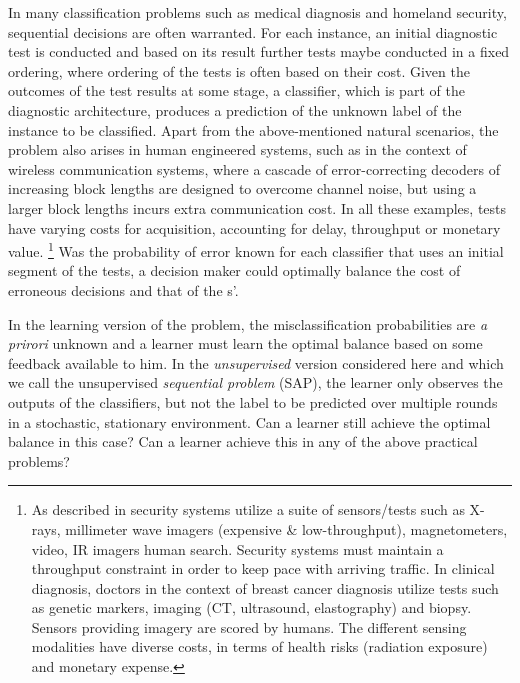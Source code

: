 In many classification problems  such as medical diagnosis  and  homeland  security,  sequential decisions  are  often  warranted.   For each  instance,  an initial diagnostic test  is conducted and based on its result further tests maybe conducted in a fixed ordering, where ordering of the tests is often based on their cost.
Given the outcomes of the test results at some stage,
a classifier, which is part of the diagnostic architecture,
produces a prediction of the unknown label of the instance to be classified.
Apart from the above-mentioned natural scenarios, 
the problem also arises in human engineered systems, such as in the context of wireless communication systems,
where a cascade of error-correcting decoders of increasing block lengths are designed to overcome channel noise, 
but using a larger block lengths incurs extra communication cost.
In all these examples, tests have varying  costs for  acquisition, accounting for delay,  throughput  or  monetary  value.%
\footnote{As described in \cite{ML13_MultistageClassifier_TrapezSaligramaCastanon} security systems utilize a suite of sensors/tests such as X-rays, millimeter wave imagers (expensive \& low-throughput), magnetometers, video, IR imagers human search.  Security systems  must  maintain  a  throughput  constraint  in  order to  keep  pace  with  arriving  traffic.   In  clinical  diagnosis, doctors  in the context of breast cancer diagnosis utilize tests such as genetic markers, imaging (CT, ultrasound, elastography) and biopsy. Sensors providing imagery are scored by humans. The different sensing  modalities  have  diverse  costs,  in  terms  of  health risks (radiation exposure) and monetary expense.}
Was the probability of error known for each classifier that uses an initial segment of the tests, 
a decision maker could optimally balance the cost of erroneous decisions and that of the \ses{}s'.

In the learning version of the problem, the misclassification probabilities are \emph{a prirori} unknown and a learner must learn the optimal balance based on some feedback available to him. 
In the \emph{unsupervised} version considered here
and which we call the unsupervised \emph{sequential \ses problem} (SAP),
the learner only observes the outputs of the classifiers, but not the label to be predicted over multiple rounds
in a stochastic, stationary environment.
Can a learner still achieve the optimal balance in this case? Can a learner achieve this in any of the above
practical problems?


